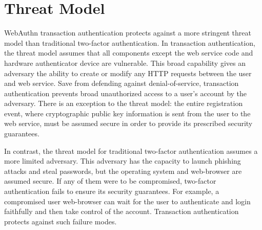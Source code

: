 \section{Threat Model}\label{Sec:ThreatModel}




WebAuthn transaction authentication protects against a more stringent threat model than traditional two-factor authentication. In transaction authentication, the threat model assumes that all components except the web service code and hardware authenticator device are vulnerable. This broad capability gives an adversary the ability to create or modify any HTTP requests between the user and web service. Save from defending against denial-of-service, transaction authentication prevents broad unauthorized access to a user's account by the adversary. There is an exception to the threat model: the entire registration event, where cryptographic public key information is sent from the user to the web service, must be assumed secure in order to provide its prescribed security guarantees.


In contrast, the threat model for traditional two-factor authentication assumes a more limited adversary. This adversary has the capacity to launch phishing attacks and steal passwords, but the operating system and web-browser are assumed secure. If any of them were to be compromised, two-factor authentication fails to ensure its security guarantees. For example, a compromised user web-browser can wait for the user to authenticate and login faithfully and then take control of the account. Transaction authentication protects against such failure modes.




